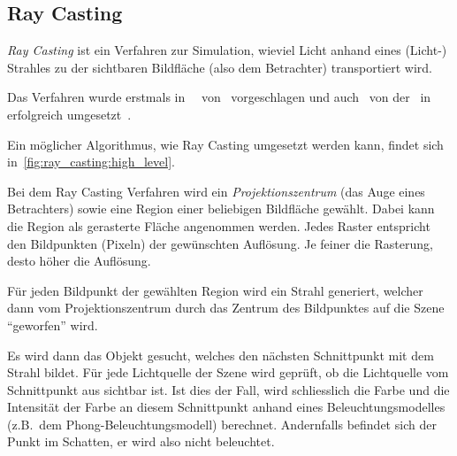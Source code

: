 
\subsection{Ray Casting}
\label{subsec:ray_casting}

\textit{Ray Casting} ist ein Verfahren zur Simulation, wieviel Licht
anhand eines (Licht-) Strahles zu der sichtbaren Bildfläche (also dem
Betrachter) transportiert wird.

Das Verfahren wurde erstmals
in~~\citeyear{appel_techniques_1968}
von~\citeauthor{appel_techniques_1968} vorgeschlagen und
auch~\citeyear{arlington_mathematical_applications_group_inc_afips_1968}
von
der~\citeauthor{arlington_mathematical_applications_group_inc_afips_1968}
in~
erfolgreich
umgesetzt~\parencites{appel_techniques_1968}{arlington_mathematical_applications_group_inc_afips_1968}.

Ein möglicher Algorithmus, wie Ray Casting umgesetzt werden kann, findet
sich in~\autoref{fig:ray_casting:high_level}.

Bei dem Ray Casting Verfahren wird ein \textit{Projektionszentrum} (das
Auge eines Betrachters) sowie eine Region einer beliebigen Bildfläche
gewählt. Dabei kann die Region als gerasterte Fläche angenommen werden.
Jedes Raster entspricht den Bildpunkten (Pixeln) der gewünschten
Auflösung. Je feiner die Rasterung, desto höher die Auflösung.

Für jeden Bildpunkt der gewählten Region wird ein Strahl generiert,
welcher dann vom Projektionszentrum durch das Zentrum des Bildpunktes
auf die Szene ``geworfen'' wird. 

Es wird dann das Objekt gesucht, welches den nächsten Schnittpunkt mit
dem Strahl bildet. Für jede Lichtquelle der Szene wird geprüft, ob die
Lichtquelle vom Schnittpunkt aus sichtbar ist. Ist dies der Fall, wird
schliesslich die Farbe und die Intensität der Farbe an diesem Schnittpunkt
anhand eines Beleuchtungsmodelles (z.B.\ dem Phong-Beleuchtungsmodell)
berechnet. Andernfalls befindet sich der Punkt im Schatten, er wird also
nicht beleuchtet.

